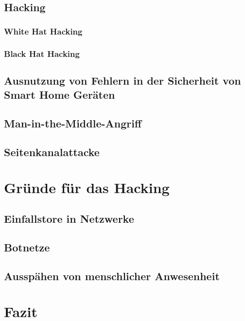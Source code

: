 \documentclass[12pt, a4paper, onecolumn, oneside, toc=bibliographynumbered, liststotoc]{scrartcl} %
\begin{document}
		\subsection{Hacking}
			\subsubsection{White Hat Hacking}
			\subsubsection{Black Hat Hacking}
		\subsection{Ausnutzung von Fehlern in der Sicherheit von Smart Home Geräten}
		\subsection{Man-in-the-Middle-Angriff}
		\subsection{Seitenkanalattacke}
		
	\section{Gründe für das Hacking}
		\subsection{Einfallstore in Netzwerke}
		\subsection{Botnetze}		
		\subsection{Ausspähen von menschlicher Anwesenheit}
	\section{Fazit}

\newpage %
\appendix %
\printbibliography %
\end{document}
